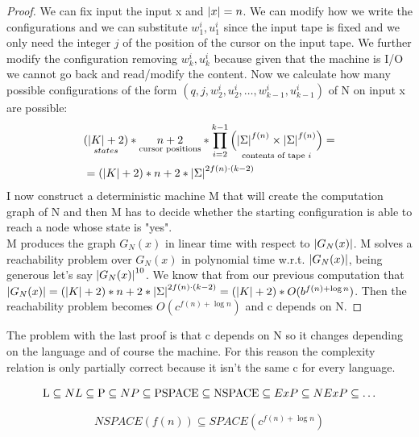 \begin{theorem}
\begin{proof}
We can fix input the input x and $\left\lvert x\right\rvert = n$. We can modify how we write the configurations and we can substitute $w_1^i, u_1^i$ since the input tape is fixed and we only need the integer $j$ of the position of the cursor on the input tape. We further modify the configuration removing $w_k^i,u_k^i$ because given that the machine is I/O we cannot go back and read/modify the content. Now we calculate how many possible configurations of the form $(q,j,w_2^i,u_2^i,\ldots,w_{k-1}^i,u_{k-1}^i)$ of N on input x are possible:
        \begin{align*}
            &\underset{states}{(\left\lvert K\right\rvert+2)} * \underset{\text{cursor positions}}{n+2} * \prod_{i=2}^{k-1}{\underset{\text{contents of tape } i}{\left( \left\lvert\Sigma\right\rvert^{f(n)} \times \left\lvert\Sigma\right\rvert^{f(n)} \right)}}=\\
            &=(\left\lvert K\right\rvert+2) * {n+2} * \left\lvert\Sigma\right\rvert^{2f(n)\cdot(k-2)}
        \end{align*}
        I now construct a deterministic machine M that will create the computation graph of N and then M has to decide whether the starting configuration is able to reach a node whose state is "yes".\\
        M produces the graph $G_N(x)$ in linear time with respect to $\left\lvert G_N(x)\right\rvert$. M solves a reachability problem over $G_N(x)$ in polynomial time w.r.t. $\left\lvert G_N(x)\right\rvert$, being generous let's say $\left\lvert G_N(x)\right\rvert^{10}$. We know that from our previous computation that $\left\lvert G_N(x)\right\rvert = (\left\lvert K\right\rvert+2) * {n+2} * \left\lvert\Sigma\right\rvert^{2f(n)\cdot(k-2)} = (\left\lvert K\right\rvert+2) * O(b^{f(n)+\log{n}})$. Then the reachability problem becomes $O(c^{f(n)+\log{n}})$ and c depends on N.
    \end{proof}
\end{theorem}
The problem with the last proof is that c depends on N so it changes depending on the language and of course the machine. For this reason the complexity relation is only partially correct because it isn't the same c for every language.
\begin{corollary}
    \[ 
        \tikznode{L}{L} \subseteq NL \subseteq \tikznode{P}{P} \subseteq  NP \subseteq \tikznode{PSPACE}{PSPACE} \subseteq \tikznode{NSPACE}{NSPACE} \subseteq ExP \subseteq NExP \subseteq \ldots
    \]
\end{corollary}
\begin{corollary}
    \[ 
        NSPACE(f(n)) \subseteq SPACE(c^{f(n) +\log{n}})
    \]
\end{corollary}
